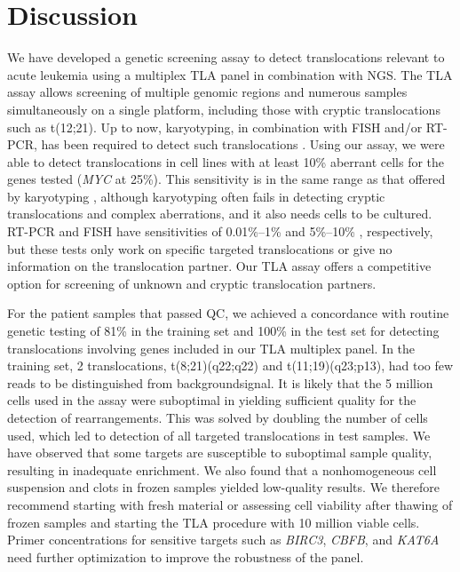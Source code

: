 \section{Discussion}\label{discussion}
We have developed a genetic screening assay to detect translocations relevant to acute leukemia using a multiplex TLA panel in combination with NGS. 
The TLA assay allows screening of multiple genomic regions and numerous samples simultaneously on a single platform, including those with cryptic translocations such as t(12;21).
Up to now, karyotyping, in combination with FISH and/or RT-PCR, has been required to detect such translocations \cite{Sandberg_2010}. 
Using our assay, we were able to detect translocations in cell lines with at least 10\% aberrant cells for the genes tested (\textsl{MYC} at 25\%). 
This sensitivity is in the same range as that offered by karyotyping \cite{Pinkel_1986, Buzzard_2004}, although karyotyping often fails in detecting cryptic translocations and complex aberrations, and it also needs cells to be cultured. 
RT-PCR and FISH have sensitivities of 0.01\%–1\% \cite{Burmeister_2015,Salto_Tellez_2003} and 5\%–10\% \cite{Schoch_2002,Aypar_2014,Liew_2016}, respectively, but these tests only work on specific targeted translocations or give no information on the translocation partner. 
Our TLA assay offers a competitive option for screening of unknown and cryptic translocation partners. 

For the patient samples that passed QC, we achieved a concordance with routine genetic testing of 81\% in the training set and 100\% in the test set for detecting translocations involving genes included in our TLA multiplex panel. 
In the training set, 2 translocations, t(8;21)(q22;q22) and t(11;19)(q23;p13), had too few reads to be distinguished from backgroundsignal.
It is likely that the 5 million cells used in the assay were suboptimal in yielding sufficient quality for the detection of rearrangements. 
This was solved by doubling the number of cells used, which led to detection of all targeted translocations in test samples. 
We have observed that some targets are susceptible to suboptimal sample quality, resulting in inadequate enrichment. 
We also found that a nonhomogeneous cell suspension and clots in frozen samples yielded low-quality results. 
We therefore recommend starting with fresh material or assessing cell viability after thawing of frozen samples and starting the TLA procedure with 10 million viable cells. 
Primer concentrations for sensitive targets such as \textsl{BIRC3}, \textsl{CBFB}, and \textsl{KAT6A} need further optimization to improve the robustness of the panel. 

